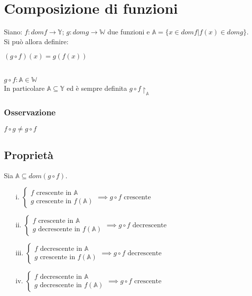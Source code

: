 \section{Composizione di funzioni}
Siano: $f: domf \rightarrow \mathbb{Y}$; $g: domg \rightarrow \mathbb{W}$ due funzioni e $\mathbb{A}=\{x \in domf | f(x) \in domg\}$. Si può allora definire:\\
\begin{Large}
$(g \circ f)(x) = g(f(x))$
\end{Large}\\
$g \circ f: \mathbb{A} \in \mathbb{W}$\\
In particolare $\mathbb{A} \subseteq \mathbb{Y}$ ed è sempre definita $g \circ f \restriction _\mathbb{A}$
\subsubsection{Osservazione}
$f \circ g \neq g \circ f$


\subsection{Proprietà}
Sia $\mathbb{A} \subseteq dom(g \circ f)$.
\begin{enumerate}
\item[i.] $\begin{cases}
f \text{ crescente in } \mathbb{A}\\
g \text{ crescente in } f(\mathbb{A})
\end{cases} \implies g \circ f \text{ crescente}$
\item[ii.] $\begin{cases}
f \text{ crescente in } \mathbb{A}\\
g \text{ decrescente in } f(\mathbb{A})
\end{cases} \implies g \circ f \text{ decrescente}$
\item[iii.] $\begin{cases}
f \text{ decrescente in } \mathbb{A}\\
g \text{ crescente in } f(\mathbb{A})
\end{cases} \implies g \circ f \text{ decrescente}$
\item[iv.] $\begin{cases}
f \text{ decrescente in } \mathbb{A}\\
g \text{ decrescente in } f(\mathbb{A})
\end{cases} \implies g \circ f \text{ crescente}$
\end{enumerate} 
